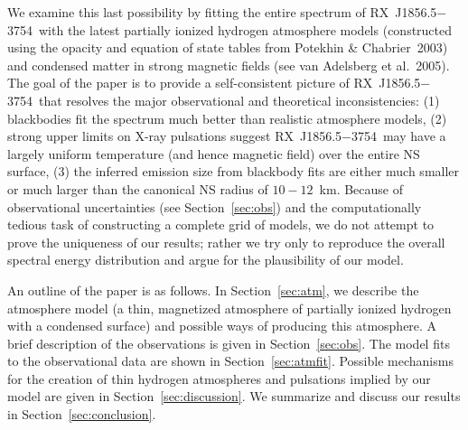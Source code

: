 \documentclass[useAMS,usegraphicx]{mn2e}
\newcommand{\etal}{et al.}
\newcommand{\rxjw}{RX~J1856.5$-$3754}
\begin{document}
We examine this last possibility by fitting the entire spectrum
of \rxjw\ with the latest partially ionized hydrogen atmosphere models
(constructed using the opacity and equation of state tables from
Potekhin \& Chabrier~2003) and condensed matter in strong magnetic fields
(see van Adelsberg \etal~2005).
The goal of the paper is to provide a self-consistent picture of \rxjw\
that resolves the major observational and theoretical inconsistencies:
(1) blackbodies fit the spectrum much better than realistic atmosphere models,
(2) strong upper limits on X-ray pulsations suggest \rxjw\ may have a largely
uniform temperature (and hence magnetic field) over the entire NS surface,
(3) the inferred emission size from blackbody fits are either much
smaller or much larger than the canonical NS radius of $10-12$~km.
Because of observational uncertainties  (see Section~\ref{sec:obs}) and
the computationally tedious task of constructing a complete
grid of models, we do not attempt to prove the uniqueness of our results;
rather we try only to reproduce the overall spectral energy distribution
and argue for the plausibility of our model.

An outline of the paper is as follows.
In Section~\ref{sec:atm}, we describe the atmosphere model
(a thin, magnetized atmosphere of partially ionized hydrogen with a
condensed surface) and possible ways of producing this atmosphere.
A brief description of the observations is given in Section~\ref{sec:obs}.
The model fits to the observational data are shown in Section~\ref{sec:atmfit}.
Possible mechanisms for the creation of thin hydrogen atmospheres and
pulsations implied by our model are given in Section~\ref{sec:discussion}.
We summarize and discuss our results in Section~\ref{sec:conclusion}.

\end{document}
